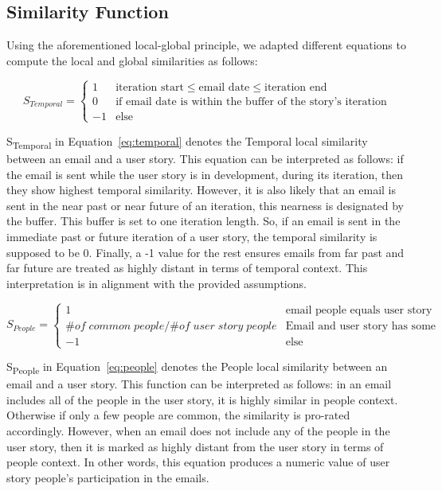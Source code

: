 \subsection{Similarity Function}
Using the aforementioned local-global principle, we adapted different equations to compute the local and global similarities as follows:

\begin{equation}
\label{eq:temporal}
S_{Temporal} =
\begin{cases}
1 & \mbox{iteration start} \le \mbox{email date} \le \mbox{iteration end}\\
0 & \mbox{if email date is within the buffer of the story's iteration} \\
-1 & \mbox{else}
\end{cases}
\end{equation}

S\textsubscript{Temporal} in Equation~\ref{eq:temporal} denotes the Temporal local similarity between an email and a user story. This equation can be interpreted as follows: if the email is sent while the user story is in development, during its iteration, then they show highest temporal similarity. However, it is also likely that an email is sent in the near past or near future of an iteration, this nearness is designated by the buffer. This buffer is set to one iteration length. So, if an email is sent in the immediate past or future iteration of a user story, the temporal similarity is supposed to be 0. Finally, a -1 value for the rest ensures emails from far past and far future are treated as highly distant in terms of temporal context. This interpretation is in alignment with the provided assumptions.

\begin{equation}
\label{eq:people}
S_{People} =
\begin{cases}
1 & \mbox{email people equals user story people}\\
\# of \; common \; people/\# of \;user \;story \;people & \mbox{Email and user story has some common people} \\
-1 & \mbox{else}
\end{cases}
\end{equation}

S\textsubscript{People} in Equation~\ref{eq:people} denotes the People local similarity between an email and a user story. This function can be interpreted as follows: in an email includes all of the people in the user story, it is highly similar in people context. Otherwise if only a few people are common, the similarity is pro-rated accordingly. However, when an email does not include any of the people in the user story, then it is marked as highly distant from the user story in terms of people context. In other words, this equation produces a numeric value of user story people's participation in the emails.

